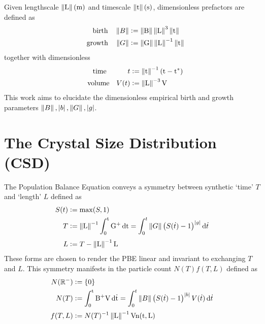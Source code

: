 \documentclass[a4paper]{base}
\newcommand{\crit}[1]{\M{#1^{*}}}
\begin{document}
    Given lengthscale $\norm{\dn{L}}\un{m}$ and timescale $\norm{\dn{t}}\un{s}$, dimensionless prefactors are defined as
    \begin{equation}\label{def:Intro:BG}
        \begin{aligned}
            \QT{birth} \norm{B} &\deq \norm{\dn{B}} \norm{\dn{L}}^{3}\norm{\dn{t}} \\
            \QT{growth} \norm{G} &\deq \norm{\dn{G}} \norm{\dn{L}}^{-1}\norm{\dn{t}}
        \end{aligned}
    \end{equation}
    together with dimensionless
    \begin{equation}\label{def:Intro:tV}
        \begin{aligned}
            \QT{time}\qquad t &\deq \norm{\dn{t}}^{-1} (\dn{t}-\crit{\dn{t}}) \\
            \QT{volume} V(t) &\deq \norm{\dn{L}}^{-3} \dn{V}
        \end{aligned}
    \end{equation}
    This work aims to elucidate the dimensionless empirical birth and growth parameters $\left\lVert{B}\right\rVert,\left\lvert{b}\right\rvert,\left\lVert{G}\right\rVert,\left\lvert{g}\right\rvert$.
    

\section{The Crystal Size Distribution (CSD)}\label{sec:CSD}
    The Population Balance Equation conveys a symmetry between synthetic `time' $T$ and `length' $L$ defined as
    \begin{subequations} \label{def:CSD:TL}
        \begin{align}
            S(t) &\deq \max (S,1) \\
            T &\deq \norm{\dn{L}}^{-1} \dn{\int_{0}^{t} G^{+} \, d{t}} 
                = \int_{0}^{t} \norm{G} \left(S(\dot{t})-1\right)^{\mds{g}} \!\dd{\dot{t}} \label{def:CSD:T} \\[3pt]
            L &\deq T -  \norm{\dn{L}}^{-1} \dn{L}
        \end{align}
    \end{subequations}
    These forms are chosen to render the PBE linear and invariant to exchanging $T$ and $L$.
    This symmetry manifests in the particle count $N(T)f(T,L)$ defined as
    \begin{subequations} \label{def:CSD:Nf}
        \begin{align}
            N(\bb{R^{-}}) &\deq \set{0} \\
            N(T) &\deq \dn{\int_{0}^{t} B^{+} V \, d\dot{t}} 
                = \int_{0}^{t} \norm{B} \left(S(\dot{t})-1\right)^{\mds{b}} V(\dot{t}) \dd{\dot{t}} \label{def:CSD:N} \\[2pt]
            f(T,L) &\deq N(T)^{-1} \norm{\dn{L}}^{-1} \dn{V n(t,L)}
        \end{align}
    \end{subequations}
\end{document}
